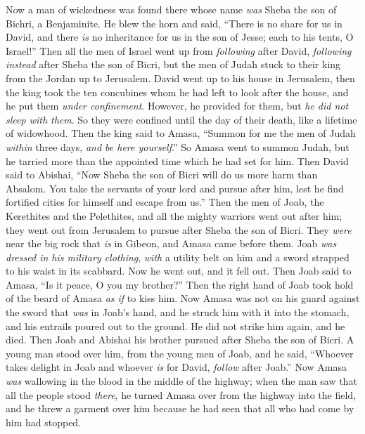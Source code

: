 \begin{biblechapter} %
 Now a man of wickedness was found there whose name \textit{was} Sheba the son of Bichri, a Benjaminite. He blew the horn and said, “There is no share for us in David, and there \textit{is} no inheritance for us in the son of Jesse; each to his tents, O Israel!”
\verse Then all the men of Israel went up from \textit{following} after David, \textit{following instead} after Sheba the son of Bicri, but the men of Judah stuck to their king from the Jordan up to Jerusalem.
\verse David went up to his house in Jerusalem, then the king took the ten concubines whom he had left to look after the house, and he put them \textit{under confinement}. However, he provided for them, but \textit{he did not sleep with them}. So they were confined until the day of their death, like a lifetime of widowhood.
 Then the king said to Amasa, “Summon for me the men of Judah \textit{within} three days, \textit{and be here yourself}.”
\verse So Amasa went to summon Judah, but he tarried more than the appointed time which he had set for him.
\verse Then David said to Abishai, “Now Sheba the son of Bicri will do us more harm than Absalom. You take the servants of your lord and pursue after him, lest he find fortified cities for himself and escape from us.”
\verse Then the men of Joab, the Kerethites and the Pelethites, and all the mighty warriors went out after him; they went out from Jerusalem to pursue after Sheba the son of Bicri.
\verse They \textit{were} near the big rock that \textit{is} in Gibeon, and Amasa came before them. Joab \textit{was dressed in his military clothing}, \textit{with} a utility belt on him and a sword strapped to his waist in its scabbard. Now he went out, and it fell out.
\verse Then Joab said to Amasa, “Is it peace, O you my brother?” Then the right hand of Joab took hold of the beard of Amasa \textit{as if} to kiss him.
\verse Now Amasa was not on his guard against the sword that \textit{was} in Joab’s hand, and he struck him with it into the stomach, and his entrails poured out to the ground. He did not strike him again, and he died. Then Joab and Abishai his brother pursued after Sheba the son of Bicri.
\verse A young man stood over him, from the young men of Joab, and he said, “Whoever takes delight in Joab and whoever \textit{is} for David, \textit{follow} after Joab.”
\verse Now Amasa \textit{was} wallowing in the blood in the middle of the highway; when the man saw that all the people stood \textit{there}, he turned Amasa over from the highway into the field, and he threw a garment over him because he had seen that all who had come by him had stopped.

\end{biblechapter}
